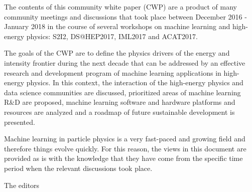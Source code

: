 The contents of this community white paper (CWP) are a product of many community meetings and discussions that took place between December 2016 - January 2018 in the course of several workshops on machine learning and high-energy physics: S2I2, DS@HEP2017, IML2017 and ACAT2017.
 

The goals of the CWP are to define the physics drivers of the energy and intensity frontier during the next decade that can be addressed by an effective research and development program of machine learning applications in high-energy physics. In this context, the interaction of the high-energy physics and data science communities are discussed, prioritized areas of machine learning R\&D are proposed, machine learning software and hardware platforms and resources are analyzed and a roadmap of future sustainable development is presented.    

Machine learning in particle physics is a very fast-paced and growing field and therefore things evolve quickly. For this reason, the views in this document are provided as is with the knowledge that they have come from the specific time period when the relevant discussions took place. 

The editors
